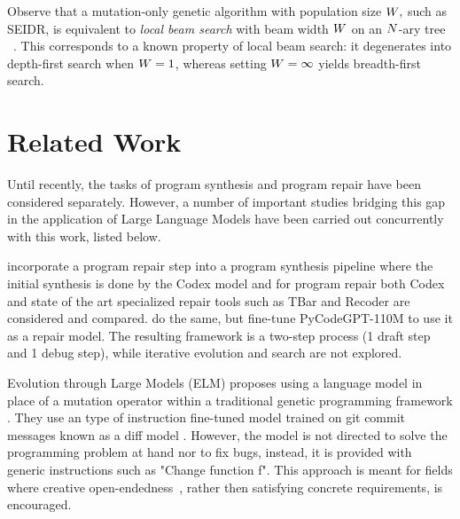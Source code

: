 Observe that a mutation-only genetic algorithm with population size $W{},$ such as SEIDR, is equivalent to \emph{local beam search} with beam width $W{}$ on an $N{}$-ary tree ~\cite[Section 4.1.4]{russell2010:artificial}. This corresponds to a known property of local beam search: it degenerates into depth-first search when $W{} = 1$, whereas setting $W{} = \infty$ yields breadth-first search.


\newpage
\section{Related Work}
\label{sec:seidr-related-work}

Until recently, the tasks of program synthesis \cite{gulwaniProgramSynthesis2017} and program repair \cite{gouesAutomatedProgramRepair2019, petke2018:genetic} have been considered separately.
However, a number of important studies bridging this gap in the application of Large Language Models have been carried out concurrently with this work, listed below.

\cite{fanAutomatedRepairPrograms2023} incorporate a program repair step into a program synthesis pipeline where the initial synthesis is done by the Codex model \cite{chenEvaluatingLargeLanguage2021} and for program repair both Codex and state of the art specialized repair tools such as TBar and Recoder \cite{Defects4JDatabaseExisting} are considered and compared. \cite{zhangSelfEditFaultAwareCode2023} do the same, but fine-tune PyCodeGPT-110M \cite{zanCERTContinualPretraining2022} to use it as a repair model. The resulting framework is a two-step process (1 draft step and 1 debug step), while iterative evolution and search are not explored. 

Evolution through Large Models (ELM) \cite{lehmanEvolutionLargeModels2022} proposes using a language model in place of a mutation operator within a traditional genetic programming framework \cite{koza1994:genetic}. They use an type of instruction fine-tuned model trained on git commit messages known as a diff model \cite{DiffModelsNew2023}. However, the model is not directed to solve the programming problem at hand nor to fix bugs, instead, it is provided with generic instructions such as "Change function f". This approach is meant for fields where creative open-endedness~\cite{stanleyWhyGreatnessCannot2015a}, rather then satisfying concrete requirements, is encouraged.

